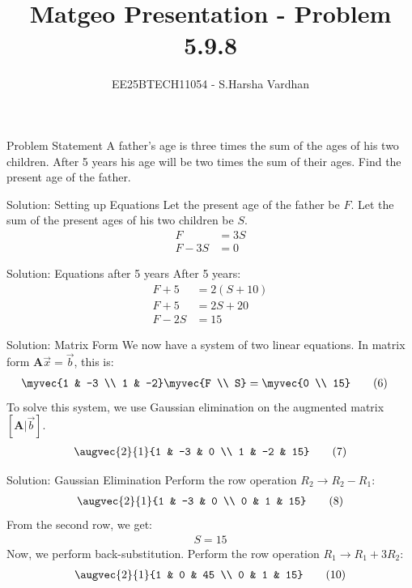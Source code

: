 \documentclass{beamer}
\title{Matgeo Presentation - Problem 5.9.8}
\author{EE25BTECH11054 - S.Harsha Vardhan}
\numberwithin{equation}{section}
\theoremstyle{remark}
\providecommand{\mtx}[1]{\mathbf{#1}}
\begin{document}
\begin{frame}
  \titlepage
\end{frame}

\begin{frame}{Problem Statement}
A father's age is three times the sum of the ages of his two children. After 5 years his age will be two times the sum of their ages. Find the present age of the father.
\end{frame}

\begin{frame}{Solution: Setting up Equations}
Let the present age of the father be $F$.
Let the sum of the present ages of his two children be $S$.
\begin{align}
F &= 3S \tag{1} \\
F - 3S &= 0 \tag{2}
\end{align}
\end{frame}

\begin{frame}{Solution: Equations after 5 years}
After 5 years:
\begin{align}
F + 5 &= 2(S + 10) \tag{3} \\
F + 5 &= 2S + 20 \tag{4} \\
F - 2S &= 15 \tag{5}
\end{align}
\end{frame}

\begin{frame}{Solution: Matrix Form}
We now have a system of two linear equations. In matrix form $\mtx{A}\vec{x} = \vec{b}$, this is:
\begin{align}
\myvec{1 & -3 \\ 1 & -2} \myvec{F \\ S} &= \myvec{0 \\ 15} \tag{6}
\end{align}
To solve this system, we use Gaussian elimination on the augmented matrix $[\mtx{A}|\vec{b}]$.
\begin{align}
\augvec{2}{1}{1 & -3 & 0 \\ 1 & -2 & 15} \tag{7}
\end{align}
\end{frame}

\begin{frame}{Solution: Gaussian Elimination}
Perform the row operation $R_2 \to R_2 - R_1$:
\begin{align}
\augvec{2}{1}{1 & -3 & 0 \\ 0 & 1 & 15} \tag{8}
\end{align}
From the second row, we get:
\begin{align}
S = 15 \tag{9}
\end{align}
Now, we perform back-substitution. Perform the row operation $R_1 \to R_1 + 3R_2$:
\begin{align}
\augvec{2}{1}{1 & 0 & 45 \\ 0 & 1 & 15} \tag{10}
\end{align}
\end{frame}
\end{document}
